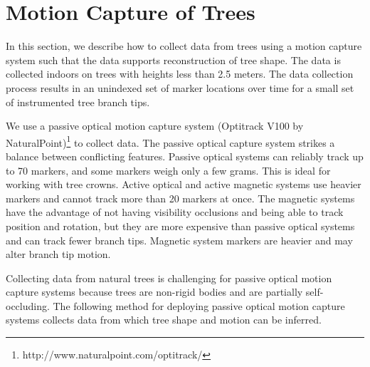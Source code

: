 \section{Motion Capture of Trees}
\label{sec:Motioncapturetrees}

In this section, we describe how to collect data from trees using a motion capture system such that the data supports reconstruction of tree shape. The data is collected indoors on trees with heights less than 2.5 meters. The data collection process results in an unindexed set of marker locations over time for a small set of instrumented tree branch tips. 

We use a passive optical motion capture system (Optitrack V100 by NaturalPoint)\footnote[1 ]{http://www.naturalpoint.com/optitrack/} to collect data. The passive optical capture system strikes a balance between conflicting features. Passive optical systems can reliably track up to 70 markers, and some markers weigh only a few grams. This is ideal for working with tree crowns. Active optical and active magnetic systems use heavier markers and cannot track more than 20 markers at once. The magnetic systems have the advantage of not having visibility occlusions and being able to track position and rotation, but they are more expensive than passive optical systems and can track fewer branch tips. Magnetic system markers are heavier and may alter branch tip motion.

Collecting data from natural trees is challenging for passive optical motion capture systems because trees are non-rigid bodies and are partially self-occluding. The following method for deploying passive optical motion capture systems collects data from which tree shape and motion can be inferred. 

